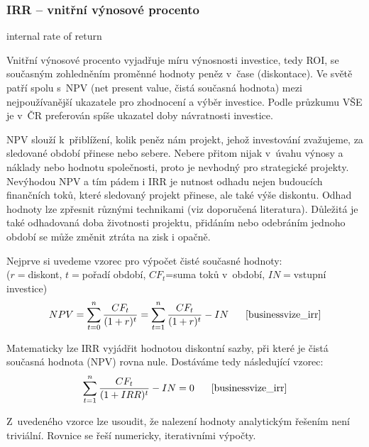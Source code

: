 \subsubsection{IRR -- vnitřní výnosové procento}
internal rate of return

Vnitřní výnosové procento vyjadřuje míru výnosnosti investice, tedy ROI, se současným zohledněním proměnné hodnoty peněz v~čase (diskontace). Ve světě patří spolu s~NPV (net present value, čistá současná hodnota) mezi nejpoužívanější ukazatele pro zhodnocení a výběr investice. Podle průzkumu VŠE je v~ČR preferován spíše ukazatel doby návratnosti investice\cite{businessvize_irr}.

NPV slouží k~přiblížení, kolik peněz nám projekt, jehož investování zvažujeme, za sledované období přinese nebo sebere. Nebere přitom nijak v~úvahu výnosy a náklady nebo hodnotu společnosti, proto je nevhodný pro strategické projekty. Nevýhodou NPV a tím pádem i IRR je nutnost odhadu nejen budoucích finančních toků, které sledovaný projekt přinese, ale také výše diskontu. Odhad hodnoty lze zpřesnit různými technikami (viz doporučená literatura). Důležitá je také odhadovaná doba životnosti projektu, přidáním nebo odebráním jednoho období se může změnit ztráta na zisk i opačně.

Nejprve si uvedeme vzorec pro výpočet čisté současné hodnoty: 
\\($r=$diskont, $t=$pořadí období, $CF_t$=suma toků v~období, $IN=$vstupní investice)
$$NPV=\sum\limits_{t=0}^{n} \dfrac{CF_t}{(1+r)^t} = \sum\limits_{t=1}^{n} \dfrac{CF_t}{(1+r)^t} - IN\scite{businessvize_irr}$$

Matematicky lze IRR vyjádřit hodnotou diskontní sazby, při které je čistá současná hodnota (NPV) rovna nule. Dostáváme tedy následující vzorec:
$$\sum\limits_{t=1}^{n} \dfrac{CF_t}{(1+IRR)^t} - IN = 0 \scite{businessvize_irr}$$

Z~uvedeného vzorce lze usoudit, že nalezení hodnoty analytickým řešením není triviální. Rovnice se řeší numericky, iterativními výpočty.





































